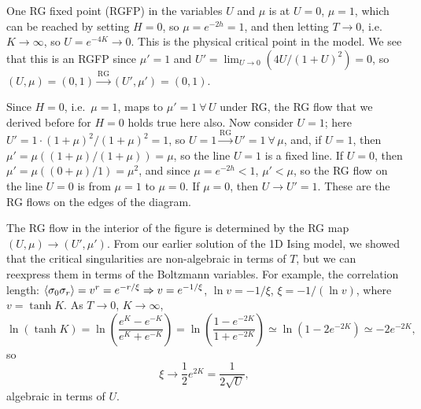 One RG fixed point (RGFP) in the variables $U$ and $\mu$ is at $U = 0$, $\mu = 1$, which can be reached by
setting $H = 0$, so $\mu = e^{-2h} = 1$, and then letting $T\to 0$, i.e.\ $K\to\infty$, so
$U = e^{-4K}\to 0$. This is the physical critical point in the model. We see that this is an RGFP since
$\mu' = 1$ and $U' = \lim_{U\to 0}(4U/(1+U)^2) = 0$, so $(U,\mu) = (0,1)\xrightarrow{\text{RG}}(U',\mu') = (0,1)$.

Since $H = 0$, i.e.\ $\mu = 1$, maps to $\mu' = 1\ \forall\,U$ under RG, the RG flow that we derived before
for $H = 0$ holds true here also. Now consider $U = 1$; here
$U' = 1\cdot(1+\mu)^2/(1+\mu)^2 = 1$, so $U = 1\xrightarrow{\text{RG}}U' = 1\ \forall\,\mu$, and, if
$U = 1$, then $\mu' = \mu\left((1+\mu)/(1+\mu)\right) = \mu$, so the line $U = 1$ is a fixed line. If
$U = 0$, then $\mu' = \mu\left((0+\mu)/1\right) = \mu^2$, and since $\mu = e^{-2h}<1$, $\mu'<\mu$, so the
RG flow on the line $U = 0$ is from $\mu = 1$ to $\mu = 0$. If $\mu = 0$, then $U\to U' = 1$. These are the RG
flows on the edges of the diagram.

\begin{diagram}
\end{diagram}

The RG flow in the interior of the figure is determined by the RG map $(U,\mu)\to(U',\mu')$. From our earlier
solution of the 1D Ising model, we showed that the critical singularities are non-algebraic in terms of $T$,
but we can reexpress them in terms of the Boltzmann variables. For example, the correlation length:
$\langle \sigma_0\sigma_r\rangle = v^r = e^{-r/\xi}\Rightarrow v = e^{-1/\xi}$, $\ln v = -1/\xi$, $\xi = -1/(\ln v)$,
where $v = \tanh K$. As $T\to 0$, $K\to\infty$,
\begin{equation}
  \ln(\tanh K) = \ln\left(\frac{e^K-e^{-K}}{e^K+e^{-K}}\right) = \ln\left(\frac{1-e^{-2K}}{1+e^{-2K}}\right)
  \simeq\ln(1-2e^{-2K})\simeq-2e^{-2K},
\end{equation}
so
\begin{equation}
  \xi\to\frac{1}{2}e^{2K} = \frac{1}{2\sqrt U},
\end{equation}
algebraic in terms of $U$.

